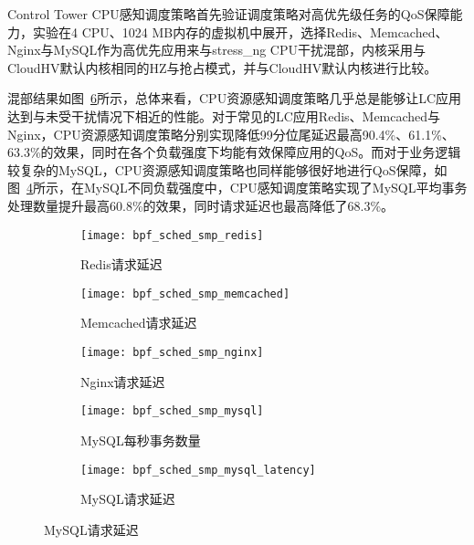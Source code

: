 
Control Tower CPU感知调度策略首先验证调度策略对高优先级任务的QoS保障能力，实验在4 CPU、1024 MB内存的虚拟机中展开，选择Redis、Memcached、Nginx与MySQL作为高优先应用来与stress\_ng CPU干扰混部，内核采用与CloudHV默认内核相同的HZ与抢占模式，并与CloudHV默认内核进行比较。

混部结果如图~\ref{fig:lc_bpf_sched}所示，总体来看，CPU资源感知调度策略几乎总是能够让LC应用达到与未受干扰情况下相近的性能。对于常见的LC应用Redis、Memcached与Nginx，CPU资源感知调度策略分别实现降低99分位尾延迟最高90.4\%、61.1\%、63.3\%的效果，同时在各个负载强度下均能有效保障应用的QoS。而对于业务逻辑较复杂的MySQL，CPU资源感知调度策略也同样能够很好地进行QoS保障，如图~\ref{fig:bpf_sched_smp_mysql}所示，在MySQL不同负载强度中，CPU感知调度策略实现了MySQL平均事务处理数量提升最高60.8\%的效果，同时请求延迟也最高降低了68.3\%。

\begin{figure}[H]
    \centering
    \begin{subfigure}[b]{0.32\textwidth}
        \texttt{[image: bpf\_sched\_smp\_redis]}
        \caption{\quad Redis请求延迟}
        \label{fig:bpf_sched_smp_memcached}
    \end{subfigure}
    \begin{subfigure}[b]{0.32\textwidth}
        \texttt{[image: bpf\_sched\_smp\_memcached]}
        \caption{\quad Memcached请求延迟}
        \label{fig:bpf_sched_smp_memcached}
    \end{subfigure}
    \begin{subfigure}[b]{0.32\textwidth}
        \texttt{[image: bpf\_sched\_smp\_nginx]}
        \caption{\quad Nginx请求延迟}
        \label{fig:bpf_sched_smp_memcached}
    \end{subfigure}
    \begin{subfigure}[b]{0.32\textwidth}
        \texttt{[image: bpf\_sched\_smp\_mysql]}
        \caption{\quad MySQL每秒事务数量}
        \label{fig:bpf_sched_smp_mysql}
    \end{subfigure}
    \begin{subfigure}[b]{0.32\textwidth}
        \texttt{[image: bpf\_sched\_smp\_mysql\_latency]}
        \caption{\quad MySQL请求延迟} 
        \label{fig:bpf_sched_smp_mysql_latency}
    \end{subfigure}

\label{fig:lc_bpf_sched}
\end{figure}

